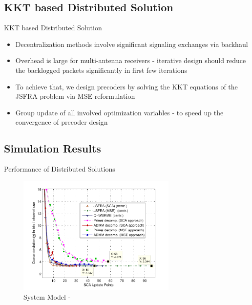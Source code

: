 \documentclass[9pt]{beamer}
\begin{document}
\subsection{KKT based Distributed Solution}

\begin{frame}{KKT based Distributed Solution}
	\begin{itemize}
		\item Decentralization methods involve significant signaling exchanges via backhaul
		\item \alert{Overhead is large for multi-antenna receivers} - iterative design should reduce the backlogged packets significantly in first few iterations
		\item To achieve that, we design precoders by solving the \ac{KKT} equations of the \acs{JSFRA} problem via \acs{MSE} reformulation
		\item \alert{Group update of all involved optimization variables} - to speed up the convergence of precoder design
	\end{itemize}
\end{frame}

\subsection{Simulation Results}

\begin{frame}{Performance of Distributed Solutions}
	\begin{figure}
		\centering
		\includegraphics[width=0.7\textwidth]{fig-3-2}
		\caption{System Model - }
	\end{figure}
\end{frame}
\end{document}
